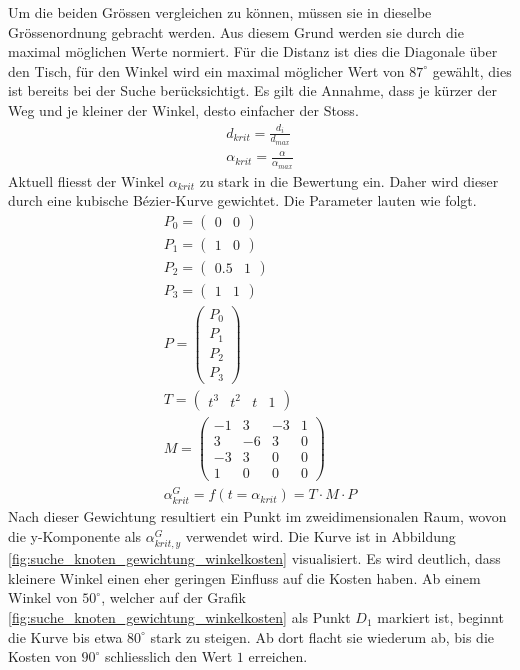 Um die beiden Grössen vergleichen zu können, müssen sie in dieselbe Grössenordnung gebracht werden. Aus diesem Grund
werden sie durch die maximal möglichen Werte normiert\cite{qucosa:ein_billardroboter:1}. Für die Distanz ist dies die
Diagonale über den Tisch, für den Winkel wird ein maximal möglicher Wert von $87^\circ$ gewählt, dies ist bereits bei
der Suche berücksichtigt. Es gilt die Annahme, dass je kürzer der Weg und je kleiner der Winkel,
desto einfacher der Stoss.
\begin{align}
    d_{krit} = \frac{d_i}{d_{max}}\\
    \alpha_{krit} = \frac{\alpha}{\alpha_{max}}
\end{align}
Aktuell fliesst der Winkel $\alpha_{krit}$ zu stark in die Bewertung ein. Daher wird dieser durch eine kubische
Bézier-Kurve\cite{wiki.bezier:1} gewichtet. Die Parameter lauten wie folgt.
\begin{align}
    P_0 = \begin{pmatrix} 0 & 0\end{pmatrix}\\
    P_1 = \begin{pmatrix} 1 & 0\end{pmatrix}\\
    P_2 = \begin{pmatrix} 0.5 & 1\end{pmatrix}\\
    P_3 = \begin{pmatrix} 1 & 1\end{pmatrix}\\
    P = \begin{pmatrix} P_0 \\ P_1 \\ P_2 \\ P_3\end{pmatrix}\\
    T = \begin{pmatrix} t^3 & t^2 & t & 1\end{pmatrix}\\
    M = \begin{pmatrix}
            -1 &  3 & -3 & 1\\
             3 & -6 &  3 & 0\\
            -3 &  3 &  0 & 0\\
             1 &  0 &  0 & 0
        \end{pmatrix}\\
    \alpha^G_{krit} = f(t = \alpha_{krit}) = T \cdot M \cdot P
\end{align}
Nach dieser Gewichtung resultiert ein Punkt im zweidimensionalen Raum, wovon die y-Komponente als $\alpha^G_{krit, y}$ verwendet wird.
Die Kurve ist in Abbildung \ref{fig:suche_knoten_gewichtung_winkelkosten}
visualisiert. Es wird deutlich, dass kleinere Winkel einen eher geringen Einfluss auf die Kosten haben.
Ab einem Winkel von $50^\circ$, welcher auf der Grafik \ref{fig:suche_knoten_gewichtung_winkelkosten} als Punkt $D_1$ markiert ist,
beginnt die Kurve bis etwa $80^\circ$ stark zu steigen. Ab dort flacht sie wiederum ab, bis die Kosten von $90^\circ$ schliesslich den Wert
$1$ erreichen.

